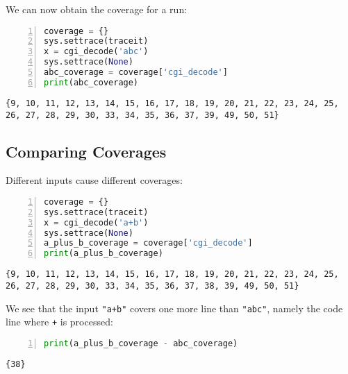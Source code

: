 \documentclass[10pt,parskip=half,
	toc=sectionentrywithdots,
	bibliography=totocnumbered,
	captions=tableheading,numbers=noendperiod]{scrartcl}
\begin{document}
We can now obtain the coverage for a run:

\begin{lstlisting}[language=Python,numbers=left,xleftmargin=20pt,xrightmargin=5pt,belowskip=5pt,aboveskip=5pt]
coverage = {}
sys.settrace(traceit)
x = cgi_decode('abc')
sys.settrace(None)
abc_coverage = coverage['cgi_decode']
print(abc_coverage)
\end{lstlisting}

\begin{lstlisting}[language={},postbreak={},numbers=none,xrightmargin=7pt,belowskip=5pt,aboveskip=5pt,breakindent=0pt]
{9, 10, 11, 12, 13, 14, 15, 16, 17, 18, 19, 20, 21, 22, 23, 24, 25, 26, 27, 28, 29, 30, 33, 34, 35, 36, 37, 39, 49, 50, 51}

\end{lstlisting}

\subsection{Comparing Coverages}\label{comparing-coverages}

Different inputs cause different coverages:

\begin{lstlisting}[language=Python,numbers=left,xleftmargin=20pt,xrightmargin=5pt,belowskip=5pt,aboveskip=5pt]
coverage = {}
sys.settrace(traceit)
x = cgi_decode('a+b')
sys.settrace(None)
a_plus_b_coverage = coverage['cgi_decode']
print(a_plus_b_coverage)
\end{lstlisting}

\begin{lstlisting}[language={},postbreak={},numbers=none,xrightmargin=7pt,belowskip=5pt,aboveskip=5pt,breakindent=0pt]
{9, 10, 11, 12, 13, 14, 15, 16, 17, 18, 19, 20, 21, 22, 23, 24, 25, 26, 27, 28, 29, 30, 33, 34, 35, 36, 37, 38, 39, 49, 50, 51}

\end{lstlisting}

We see that the input \texttt{"a+b"} covers one more line than
\texttt{"abc"}, namely the code line where
\texttt{\textquotesingle{}+\textquotesingle{}} is processed:

\begin{lstlisting}[language=Python,numbers=left,xleftmargin=20pt,xrightmargin=5pt,belowskip=5pt,aboveskip=5pt]
print(a_plus_b_coverage - abc_coverage)
\end{lstlisting}

\begin{lstlisting}[language={},postbreak={},numbers=none,xrightmargin=7pt,belowskip=5pt,aboveskip=5pt,breakindent=0pt]
{38}

\end{lstlisting}
\end{document}
